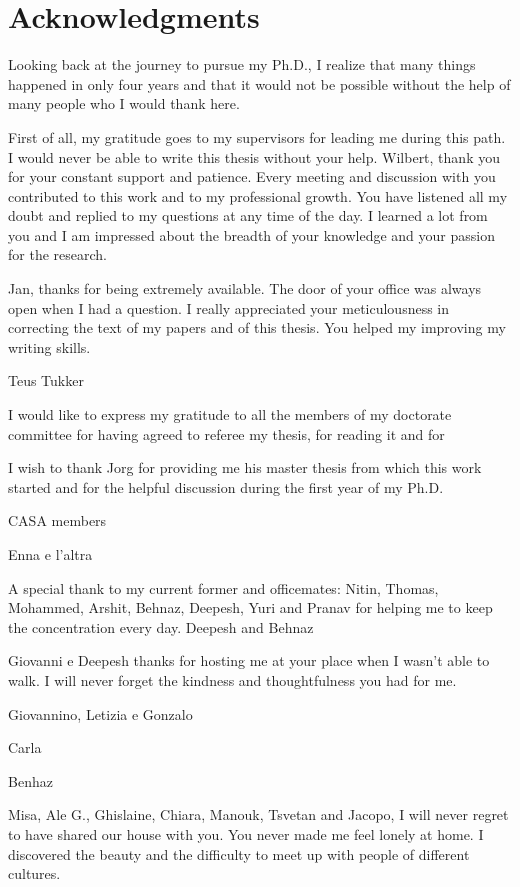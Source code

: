 \clearpage{\pagestyle{empty}\cleardoublepage}

\chapter*{Acknowledgments}
\markboth{}{}
Looking back at the journey to pursue my Ph.D., I realize that many things happened in only four years and that it would not be possible without the help of many people who I would thank here. 

First of all, my gratitude goes to my supervisors for leading me during this path. I would never be able to write this thesis without your help.
Wilbert, thank you for your constant support and patience. Every meeting and discussion with you contributed to this work and to my professional growth. 
You have listened all my doubt and replied to my questions at any time of the day.
I learned a lot from you and I am impressed about the breadth of your knowledge and your passion for the research. 

Jan, thanks for being extremely available. The door of your office was always open when I had a question. I really appreciated your meticulousness in correcting the text of my papers and of this thesis. You helped my improving my writing skills.

Teus Tukker

I would like to express my gratitude to all the members of my doctorate committee for having agreed to referee my thesis, for reading it and for  

I wish to thank Jorg for providing me his master thesis from which this work started and for the helpful discussion during the first year of my Ph.D.

CASA members

Enna e l'altra

A special thank to my current former and officemates: Nitin, Thomas, Mohammed, Arshit, Behnaz, Deepesh, Yuri and Pranav for helping me to keep the concentration every day.
Deepesh and Behnaz   


Giovanni e Deepesh thanks for hosting me at your place when I wasn't able to walk. I will never forget the kindness and thoughtfulness you had for me.

Giovannino, Letizia e Gonzalo

Carla

Benhaz

Misa, Ale G., Ghislaine, Chiara, Manouk, Tsvetan and Jacopo, I will never regret to have shared our house with you. You never made me feel lonely at home. I discovered the beauty and the difficulty to meet up with people of different cultures.

